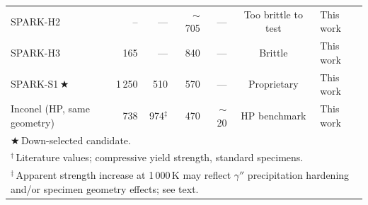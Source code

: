 \documentclass[11pt,a4paper]{article}
\begin{document}
\begin{landscape}
\begin{table}[p]
\begin{tabular}{lrrrrcl}
SPARK-H2              &  --& ---  & $\sim$705  & ---  & Too brittle to test & This work \\
SPARK-H3              &  165 & ---  &   840      & ---  & Brittle & This work \\
SPARK-S1\,$\bigstar$  & 1\,250 & 510 &   570      & ---  & Proprietary & This work \\
\midrule
Inconel (HP, same geometry)      &  738 & 974$^\ddagger$  &   470 & $\sim$20 & HP benchmark & This work \\
\bottomrule
\multicolumn{7}{l}{\scriptsize $\bigstar$\,Down-selected candidate.} \\
\multicolumn{7}{l}{\scriptsize $^\dagger$\,Literature values; compressive yield strength, standard specimens.} \\
\multicolumn{7}{l}{\scriptsize $^\ddagger$\,Apparent strength increase at 1\,000\,K may reflect $\gamma''$ precipitation hardening and/or specimen geometry effects; see text.}
\end{tabular}
\end{table}
\end{landscape}
\end{document}
